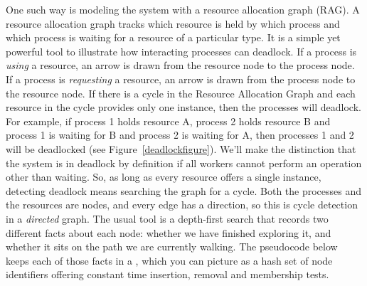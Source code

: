One such way is modeling the system with a resource allocation graph (RAG).
A resource allocation graph tracks which resource is held by which process and which process is waiting for a resource of a particular type.
It is a simple yet powerful tool to illustrate how interacting processes can deadlock.
If a process is \emph{using} a resource, an arrow is drawn from the resource node to the process node.
If a process is \emph{requesting} a resource, an arrow is drawn from the process node to the resource node.
If there is a cycle in the Resource Allocation Graph and each resource in the cycle provides only one instance, then the processes will deadlock.
For example, if process 1 holds resource A, process 2 holds resource B and process 1 is waiting for B and process 2 is waiting for A, then processes 1 and 2 will be deadlocked (see Figure~\ref{deadlockfigure}).
We'll make the distinction that the system is in deadlock by definition if all workers cannot perform an operation other than waiting.
So, as long as every resource offers a single instance, detecting deadlock means searching the graph for a cycle.
Both the processes and the resources are nodes, and every edge has a direction, so this is cycle detection in a \emph{directed} graph.
The usual tool is a depth-first search that records two different facts about each node: whether we have finished exploring it, and whether it sits on the path we are currently walking.
The pseudocode below keeps each of those facts in a , which you can picture as a hash set of node identifiers offering constant time insertion, removal and membership tests.

